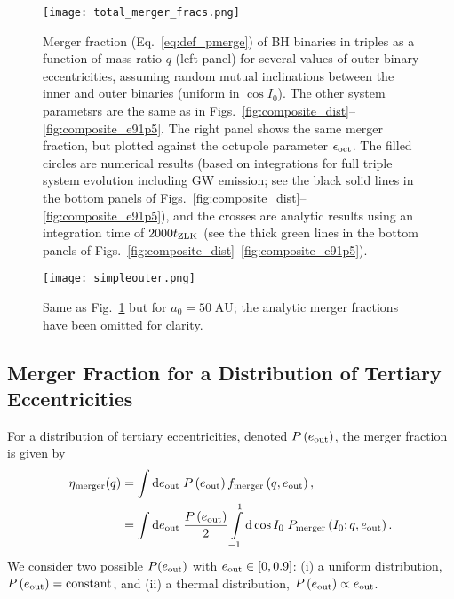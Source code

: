 \documentclass[
        fleqn,
        usenatbib,
    ]{mnras}
\newcommand*{\p}[1]{\left(#1\right)}
\begin{document}
\begin{figure*}
    \centering
    \texttt{[image: total\_merger\_fracs.png]}
    \caption{
    Merger fraction (Eq.~\ref{eq:def_pmerge}) of BH binaries in triples as a
    function of mass ratio $q$ (left panel) for several values of outer binary
    eccentricities, assuming random mutual inclinations between the inner and
    outer binaries (uniform in $\cos I_0$). The other system parametsrs are the
    same as in Figs.~\ref{fig:composite_dist}--\ref{fig:composite_e91p5}. The
    right panel shows the same merger fraction, but plotted against the octupole
    parameter $\epsilon_{\rm oct}$.  The filled circles are numerical results
    (based on integrations for full triple system evolution including GW
    emission; see the black solid lines in the bottom panels of
    Figs.~\ref{fig:composite_dist}--\ref{fig:composite_e91p5}), and the crosses
    are analytic results using an integration time of $2000 t_{\rm ZLK}$
    (see the thick green lines in the bottom panels of
    Figs.~\ref{fig:composite_dist}--\ref{fig:composite_e91p5}).
    }\label{fig:total_merger_fracs}
\end{figure*}
\begin{figure*}
    \centering
    \texttt{[image: simpleouter.png]}
    \caption{Same as Fig.~\ref{fig:total_merger_fracs} but for $a_0 =
    50\;\mathrm{AU}$; the analytic merger fractions have been omitted for
    clarity.
    }\label{fig:sweepbin_simpleouter}
\end{figure*}

\subsection{Merger Fraction for a Distribution of Tertiary Eccentricities}

For a distribution of tertiary eccentricities, denoted $P\p{e_{\rm out}}$, the
merger fraction is given by
\begin{align}
    \eta_{\rm merger}(q) &= \int \mathrm{d}e_{\rm out}\;
            P\p{e_{\rm out}} f_{\rm merger}\p{q, e_{\rm out}},\\
        &= \int\limits\mathrm{d} e_{\rm out}\; \frac{P\p{e_{\rm out}}}{2}
            \int\limits_{-1}^1\mathrm{d} \cos I_0\; P_{\rm merger}\p{I_0; q,
            e_{\rm out}}.
        \label{eq:def_eta_merge}
\end{align}
We consider two possible $P(e_{\rm out})$ with $e_{\rm out} \in [0, 0.9]$: (i) a
uniform distribution, $P\p{e_{\rm out}} = \textrm{constant}$, and (ii) a thermal
distribution, $P\p{e_{\rm out}} \propto e_{\rm out}$.
\end{document}
